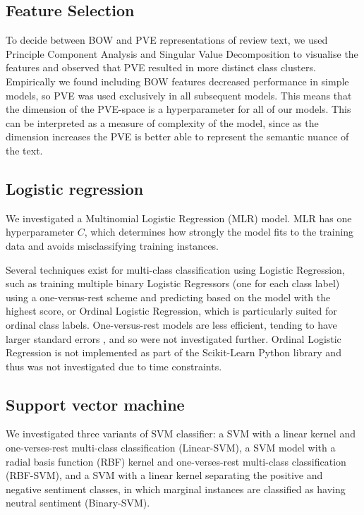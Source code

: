 \documentclass[11pt]{article}
\begin{document}
\subsection{Feature Selection} \label{subsec:method-features}

To decide between BOW and PVE representations of review text, we used Principle Component Analysis and Singular Value Decomposition to visualise the features and observed that PVE resulted in more distinct class clusters. Empirically we found including BOW features decreased performance in simple models, so PVE was used exclusively in all subsequent models. This means that the dimension of the PVE-space is a hyperparameter for all of our models. This can be interpreted as a measure of complexity of the model, since as the dimension increases the PVE is better able to represent the semantic nuance of the text.


\subsection{Logistic regression} \label{subsec:method-lr}
We investigated a Multinomial Logistic Regression (MLR) model. MLR has one hyperparameter $C$, which determines how strongly the model fits to the training data and avoids misclassifying training instances.

Several techniques exist for multi-class classification using Logistic Regression, such as training multiple binary Logistic Regressors (one for each class label) using a one-versus-rest scheme and predicting based on the model with the highest score, or Ordinal Logistic Regression, which is particularly suited for ordinal class labels.
One-versus-rest models are less efficient, tending to have larger standard errors \cite{zbMATH01817585}, and so were not investigated further.
Ordinal Logistic Regression is not implemented as part of the Scikit-Learn Python library and thus was not investigated due to time constraints.

\subsection{Support vector machine} \label{subsec:method-svm}
We investigated three variants of SVM classifier: a SVM with a linear kernel and one-verses-rest multi-class classification (Linear-SVM), a SVM model with a radial basis function (RBF) kernel and one-verses-rest multi-class classification (RBF-SVM), and a SVM with a linear kernel separating the positive and negative sentiment classes, in which marginal instances are classified as having neutral sentiment (Binary-SVM). 
\end{document}
